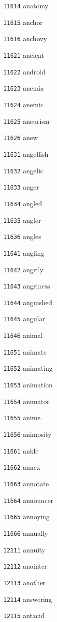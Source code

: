 \documentclass[twoside,11pt]{article}
\begin{document}
\begin{multicols}{5}
\begin{enumerate}
\item[\texttt{11614}] anatomy
\item[\texttt{11615}] anchor
\item[\texttt{11616}] anchovy
\item[\texttt{11621}] ancient
\item[\texttt{11622}] android
\item[\texttt{11623}] anemia
\item[\texttt{11624}] anemic
\item[\texttt{11625}] aneurism
\item[\texttt{11626}] anew
\item[\texttt{11631}] angelfish
\item[\texttt{11632}] angelic
\item[\texttt{11633}] anger
\item[\texttt{11634}] angled
\item[\texttt{11635}] angler
\item[\texttt{11636}] angles
\item[\texttt{11641}] angling
\item[\texttt{11642}] angrily
\item[\texttt{11643}] angriness
\item[\texttt{11644}] anguished
\item[\texttt{11645}] angular
\item[\texttt{11646}] animal
\item[\texttt{11651}] animate
\item[\texttt{11652}] animating
\item[\texttt{11653}] animation
\item[\texttt{11654}] animator
\item[\texttt{11655}] anime
\item[\texttt{11656}] animosity
\item[\texttt{11661}] ankle
\item[\texttt{11662}] annex
\item[\texttt{11663}] annotate
\item[\texttt{11664}] announcer
\item[\texttt{11665}] annoying
\item[\texttt{11666}] annually
\item[\texttt{12111}] annuity
\item[\texttt{12112}] anointer
\item[\texttt{12113}] another
\item[\texttt{12114}] answering
\item[\texttt{12115}] antacid

\end{enumerate}
\end{multicols}
\end{document}
